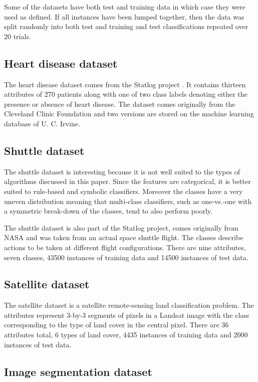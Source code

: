 \documentclass[11pt]{article}
\begin{document}
Some of the datasets have both test and training data in which case they were used
as defined. If all instances have been lumped together, then the data was split
randomly into both test and training and test classifications repeated over 20 trials.

\subsection{Heart disease dataset}

The heart disease dataset comes from the Statlog project \citep{King_etal1995}.
It contains thirteen attributes of 270 patients along with one of two class labels denoting either the presence or absence of heart disease.
The dataset comes originally from the Cleveland Clinic Foundation and two versions are stored on the machine learning database of U. C. Irvine.

\subsection{Shuttle dataset}

The shuttle dataset is interesting because it is not well suited to the types
of algorithms discussed in this paper. Since the features are categorical,
it is better suited to rule-based and symbolic classifiers.
Moreover the classes have a very uneven distribution meaning that multi-class
classifiers, such as one-vs.-one with a symmetric break-down of the classes, 
tend to also perform poorly.

The shuttle dataset is also part of the Statlog project, comes originally
from NASA and was taken from an actual space shuttle flight.
The classes describe actions to be taken at different flight configurations.
There are nine attributes, seven classes, 43500 instances of training data and 14500 instances of test data.

\subsection{Satellite dataset}

The satellite dataset is a satellite remote-sensing land classification problem.
The attributes represent 3-by-3 segments of pixels in a Landsat 
image with the class corresponding to the type of land cover in the central pixel.
There are 36 attributes total, 6 types of land cover, 4435 instances of training
data and 2000 instances of test data.

\subsection{Image segmentation dataset}
\end{document}

